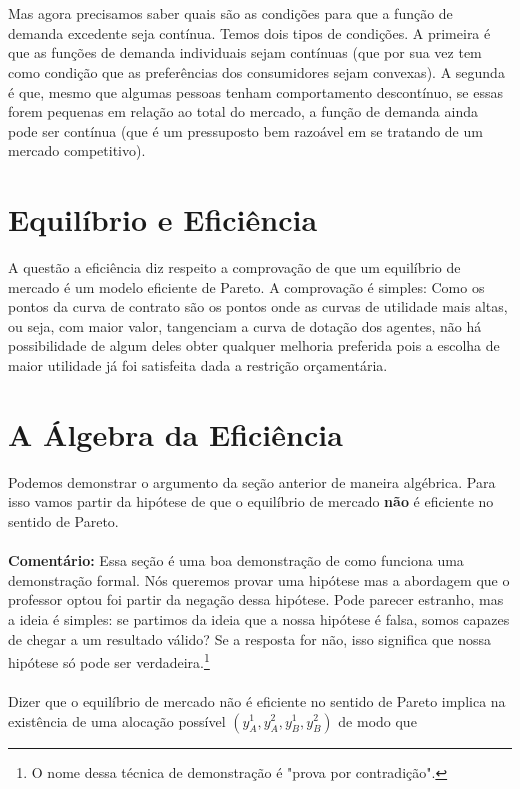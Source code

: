 \documentclass[a4paper,11pt,oneside]{book}
\theoremstyle{definition}
\theoremstyle{break}
\begin{document}
\\
\\
Mas agora precisamos saber quais são as condições para que a função de demanda excedente seja contínua. Temos dois tipos de condições. A primeira é que as funções de demanda individuais sejam contínuas (que por sua vez tem como condição que as preferências dos consumidores sejam convexas). A segunda é que, mesmo que algumas pessoas tenham comportamento descontínuo, se essas forem pequenas em relação ao total do mercado, a função de demanda ainda pode ser contínua (que é um pressuposto bem razoável em se tratando de um mercado competitivo).

\section{Equilíbrio e Eficiência}

A questão a eficiência diz respeito a comprovação de que um equilíbrio de mercado é um modelo eficiente de Pareto. A comprovação é simples: Como os pontos da curva de contrato são os pontos onde as curvas de utilidade mais altas, ou seja, com maior valor, tangenciam a curva de dotação dos agentes, não há possibilidade de algum deles obter qualquer melhoria preferida pois a escolha de maior utilidade já foi satisfeita dada a restrição orçamentária.

\section{A Álgebra da Eficiência}

Podemos demonstrar o argumento da seção anterior de maneira algébrica. Para isso vamos partir da hipótese de que o equilíbrio de mercado \textbf{não} é eficiente no sentido de Pareto.
\\
\\
\textbf{Comentário:} Essa seção é uma boa demonstração de como funciona uma demonstração formal. Nós queremos provar uma hipótese mas a abordagem que o professor optou foi partir da negação dessa hipótese. Pode parecer estranho, mas a ideia é simples: se partimos da ideia que a nossa hipótese é falsa, somos capazes de chegar a um resultado válido? Se a resposta for não, isso significa que nossa hipótese só pode ser verdadeira.\footnote{O nome dessa técnica de demonstração é "prova por contradição".}
\\
\\
Dizer que o equilíbrio de mercado não é eficiente no sentido de Pareto implica na existência de uma alocação possível $(y_A^1,y_A^2,y_B^1,y_B^2)$ de modo que
\end{document}
